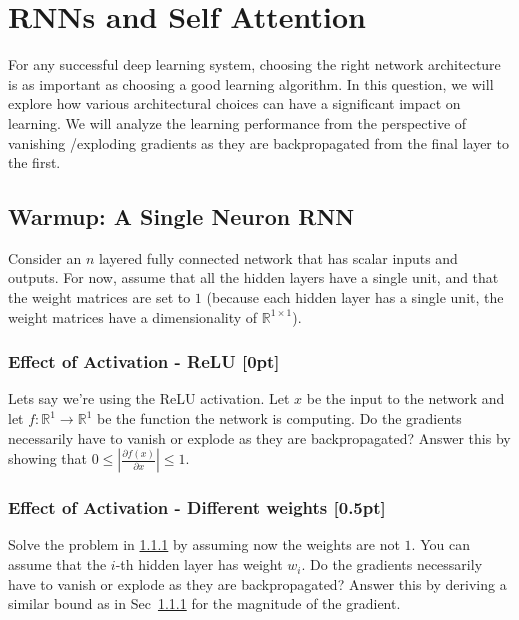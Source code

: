 \section{RNNs and Self Attention}
For any successful deep learning system, choosing the right network architecture is as important as choosing a good learning algorithm. In this question, we will explore how various architectural choices can have a significant impact on learning. We will analyze the learning performance from the perspective of vanishing /exploding gradients as they are backpropagated from the final layer to the first.

\subsection{Warmup: A Single Neuron RNN}
Consider an $n$ layered fully connected network that has scalar inputs and outputs. For now, assume that all the hidden layers have a single unit, and that the weight matrices are set to $1$ (because each hidden layer has a single unit, the weight matrices have a dimensionality of $\mathbb{R}^{1\times1}$). 

\subsubsection{Effect of Activation - ReLU [0pt]}
\label{ss:relu}

Lets say we're using the ReLU activation. 
Let $x$ be the input to the network and let $f: \mathbb{R}^{1} \rightarrow \mathbb{R}^{1}$ be the function the network is computing. Do the gradients necessarily have to vanish or explode as they are backpropagated? Answer this by showing that $0 \leq |\frac{\partial f(x)}{\partial x}| \leq  1$. \\

\subsubsection{Effect of Activation - Different weights {\color{blue} [0.5pt]} \LI}
\label{ss:tanh}
Solve the problem in \ref{ss:relu} by assuming now the weights are not $1$. You can assume that the $i$-th hidden layer has weight $w_i$. Do the gradients necessarily have to vanish or explode as they are backpropagated? Answer this by deriving a similar bound as in Sec~\ref{ss:relu} for the magnitude of the gradient. 

